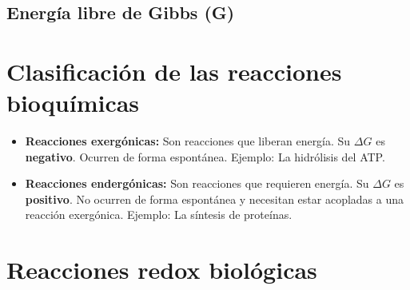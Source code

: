 \subsection{Energía libre de Gibbs (G)}


\section{Clasificación de las reacciones bioquímicas}

\begin{itemize}
    \item \textbf{Reacciones exergónicas:} Son reacciones que liberan energía. Su $\Delta G$ es \textbf{negativo}. Ocurren de forma espontánea. Ejemplo: La hidrólisis del ATP.
    \item \textbf{Reacciones endergónicas:} Son reacciones que requieren energía. Su $\Delta G$ es \textbf{positivo}. No ocurren de forma espontánea y necesitan estar acopladas a una reacción exergónica. Ejemplo: La síntesis de proteínas.
\end{itemize}


\section{Reacciones redox biológicas}


